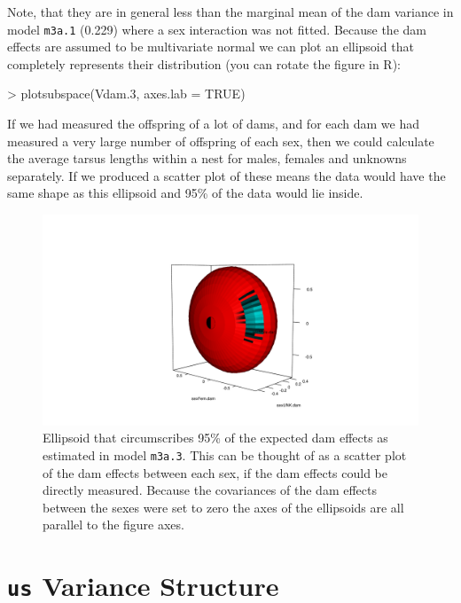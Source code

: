 \documentclass{article}
\begin{document}
Note, that they are in general less than the marginal mean of the dam variance in model \texttt{m3a.1} (0.229)  where a sex interaction was not fitted.  Because the dam effects are assumed to be multivariate normal we can plot an ellipsoid that completely represents their distribution (you can rotate the figure in R):

\begin{Schunk}
\begin{Sinput}
> plotsubspace(Vdam.3, axes.lab = TRUE)
\end{Sinput}
\end{Schunk}

If we had measured the offspring of a lot of dams, and for each dam we had measured a very large number of offspring of each sex, then we could calculate the average tarsus lengths within a nest for males, females and unknowns separately. If we produced a scatter plot of these means the data would have the same shape as this ellipsoid and 95\% of the data would lie inside.

\begin{figure}[!h]
\begin{center}
\includegraphics{rgl1.pdf}
\end{center}
\caption{Ellipsoid that circumscribes 95\% of the expected dam effects as estimated in model \texttt{m3a.3}. This can be thought of as a scatter plot of the dam effects between each sex, if the dam effects could be directly measured.  Because the covariances of the dam effects between the sexes were set to zero the axes of the ellipsoids are all parallel to the figure axes.}
\label{rgl1-fig}
\end{figure}

\section{\texttt{us} Variance Structure}
\end{document}

